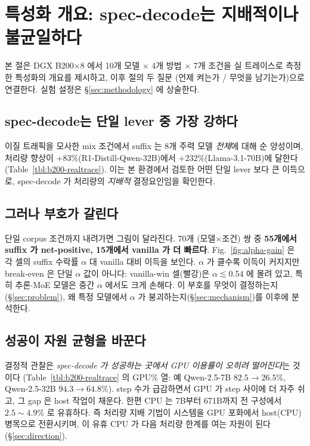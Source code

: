 
\section{특성화 개요: spec-decode는 지배적이나 불균일하다}
\label{sec:motivation}

본 절은 DGX B200$\times$8 에서 10개 모델 $\times$ 4개 방법 $\times$ 7개 조건을
실 트레이스로 측정한 특성화의 개요를 제시하고, 이후 절의 두 질문
(언제 켜는가 / 무엇을 남기는가)으로 연결한다.
실험 설정은 \S\ref{sec:methodology} 에 상술한다.




\subsection{spec-decode는 단일 lever 중 가장 강하다}
\label{subsec:mot-dominant}

이질 트래픽을 모사한 mix 조건에서 suffix 는 8개 주력 모델 \emph{전체}에 대해 순 양성이며,
처리량 향상이 $+83\%$(R1-Distill-Qwen-32B)에서 $+232\%$(Llama-3.1-70B)에 달한다
(Table~\ref{tbl:b200-realtrace}).
이는 본 환경에서 검토한 어떤 단일 lever 보다 큰 이득으로,
spec-decode 가 처리량의 \emph{지배적} 결정요인임을 확인한다.

\subsection{그러나 부호가 갈린다}
\label{subsec:mot-heterogeneous}

단일 corpus 조건까지 내려가면 그림이 달라진다.
70개 (모델$\times$조건) 쌍 중 \textbf{55개에서 suffix 가 net-positive,
15개에서 vanilla 가 더 빠르다}.
Fig.~\ref{fig:alpha-gain} 은 각 셀의 suffix 수락률 $\alpha$ 대 vanilla 대비 이득을 보인다.
$\alpha$ 가 클수록 이득이 커지지만 break-even 은 단일 $\alpha$ 값이 아니다:
vanilla-win 셀(빨강)은 $\alpha\!\lesssim\!0.54$ 에 몰려 있고,
특히 추론$\cdot$MoE 모델은 중간 $\alpha$ 에서도 크게 손해다.
이 부호를 무엇이 결정하는지(\S\ref{sec:problem}),
왜 특정 모델에서 $\alpha$ 가 붕괴하는지(\S\ref{sec:mechanism})를 이후에 분석한다.

\subsection{성공이 자원 균형을 바꾼다}
\label{subsec:mot-resource}

결정적 관찰은 \emph{spec-decode 가 성공하는 곳에서 GPU 이용률이 오히려 떨어진다}는 것이다
(Table~\ref{tbl:b200-realtrace} 의 GPU\% 열: 예 Qwen-2.5-7B $82.5\!\to\!26.5\%$,
Qwen-2.5-32B $94.3\!\to\!64.8\%$).
step 수가 급감하면서 GPU 가 step 사이에 더 자주 쉬고, 그 gap 은 host 작업이 채운다.
한편 CPU 는 7B부터 671B까지 전 구성에서 $2.5\!\sim\!4.9\%$ 로 유휴하다.
즉 처리량 지배 기법이 시스템을 GPU 포화에서 host(CPU) 병목으로 전환시키며,
이 유휴 CPU 가 다음 처리량 한계를 여는 자원이 된다(\S\ref{sec:direction}).
